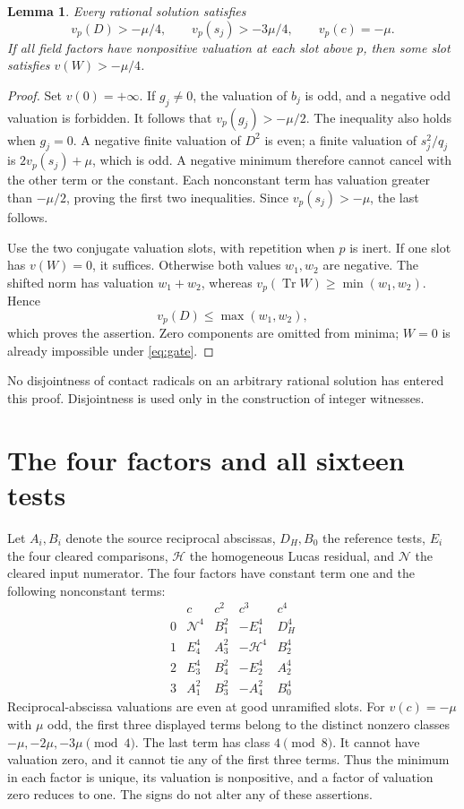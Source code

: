 \documentclass[11pt]{article}
\newtheorem{lemma}[theorem]{Lemma}
\theoremstyle{remark}\newtheorem{remark}[theorem]{Remark}
\newcommand{\Tr}{\operatorname{Tr}}\newcommand{\Nm}{\operatorname{Nm}}
\begin{document}
\begin{lemma}\label{lem:gate}
Every rational solution satisfies
\[
 v_p(D)>-\mu/4,\qquad v_p(s_j)>-3\mu/4,
 \qquad v_p(c)=-\mu.
\]
If all field factors have nonpositive valuation at each slot above
$p$, then some slot satisfies $v(W)>-\mu/4$.
\end{lemma}
\begin{proof}
Set $v(0)=+\infty$. If $g_j\ne0$, the valuation of $b_j$ is odd,
and a negative odd valuation is forbidden. It follows that
$v_p(g_j)>-\mu/2$. The inequality also holds when $g_j=0$.
A negative finite valuation of $D^2$ is even; a finite valuation of
$s_j^2/q_j$ is $2v_p(s_j)+\mu$, which is odd. A negative minimum
therefore cannot cancel with the other term or the constant. Each
nonconstant term has valuation greater than $-\mu/2$, proving the
first two inequalities. Since $v_p(s_j)>-\mu$, the last follows.

Use the two conjugate valuation slots, with repetition when $p$ is
inert. If one slot has $v(W)=0$, it suffices. Otherwise both values
$w_1,w_2$ are negative. The shifted norm has valuation $w_1+w_2$,
whereas $v_p(\Tr W)\ge\min(w_1,w_2)$. Hence
\[
 v_p(D)\le\max(w_1,w_2),
\]
which proves the assertion. Zero components are omitted from minima;
$W=0$ is already impossible under \eqref{eq:gate}.
\end{proof}
No disjointness of contact radicals on an arbitrary rational
solution has entered this proof. Disjointness is used only in the
construction of integer witnesses.

\section{The four factors and all sixteen tests}
Let $A_i,B_i$ denote the source reciprocal abscissas, $D_H,B_0$ the
reference tests, $E_i$ the four cleared comparisons, $\mathcal H$ the
homogeneous Lucas residual, and $\mathcal N$ the cleared input
numerator. The four factors have constant term one and the following
nonconstant terms:
\[
\begin{array}{c|rrrr}
 &c&c^2&c^3&c^4\\\hline
0&\mathcal N^4&B_1^2&-E_1^4&D_H^4\\
1&E_4^4&A_3^2&-\mathcal H^4&B_2^4\\
2&E_3^4&B_4^2&-E_2^4&A_2^4\\
3&A_1^2&B_3^2&-A_4^2&B_0^4
\end{array}
\]
Reciprocal-abscissa valuations are even at good unramified slots.
For $v(c)=-\mu$ with $\mu$ odd, the first three displayed terms
belong to the distinct nonzero classes
$-\mu,-2\mu,-3\mu\pmod4$. The last term has class $4\pmod8$.
It cannot have valuation zero, and it cannot tie any of the first
three terms. Thus the minimum in each factor is unique, its
valuation is nonpositive, and a factor of valuation zero reduces to
one. The signs do not alter any of these assertions.
\end{document}
